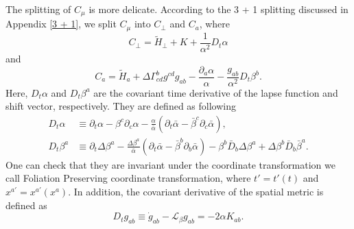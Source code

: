 \documentclass[letterpaper,nofootinbib,prd,amsmath,onecolumn]{revtex4-1}
\begin{document}
The splitting of $C_{\mu}$ is more delicate. According to the 3 + 1 splitting discussed in Appendix \ref{3 + 1}, we split $C_{\mu}$ into $C_{\perp}$ and $C_{a}$, where
\begin{equation}
C_{\perp} = {\tilde H}_{\perp} + K + \frac{1}{\alpha^{2}}D_{t}\alpha
\end{equation}
and
\begin{equation}
C_{a} = {\tilde H}_{a} + \Delta \Gamma^{b}_{cd}g^{cd}g_{ab} - \frac{\partial_{a}\alpha}{\alpha} - \frac{g_{ab}}{\alpha^2}D_{t}\beta^{b}.
\end{equation}
Here, $D_{t}\alpha$ and $D_{t}\beta^{a}$ are the covariant time derivative of the lapse function and shift vector, respectively\cite{Meng}. They are defined as following
\begin{subequations}\label{covariant lapse and shift}
\begin{align}
D_{t}\alpha &\equiv \partial_{t}\alpha - \beta^{c}\partial_{c}\alpha - \frac{\alpha}{{\bar \alpha}}\left(\partial_{t}{\bar \alpha} - {\bar \beta}^{c}\partial_{c}{\bar \alpha}\right), \\
D_{t}\beta^{a} &\equiv \partial_{t}\Delta \beta^{a} - \frac{\Delta \beta^{a}}{{\bar \alpha}}\left(\partial_{t}{\bar \alpha} - {\bar \beta}^{b}\partial_{b}{\bar \alpha}\right) - \beta^{b}{\bar D}_{b}\Delta \beta^{a} + \Delta \beta^{b}{\bar D}_{b}{\bar \beta}^{a}.
\end{align}
\end{subequations}
One can check that they are invariant under the coordinate transformation we call Foliation Preserving coordinate transformation, where $t' = t'(t)$ and $x^{a'} = x^{a'}(x^{a})$. In addition, the covariant derivative of the spatial metric is defined as
\begin{equation}\label{covariant spatial metric}
D_{t}g_{ab} \equiv {\dot g}_{ab} - \mathcal{L}_{\beta}g_{ab} = -2\alpha K_{ab}.
\end{equation}
\end{document}
